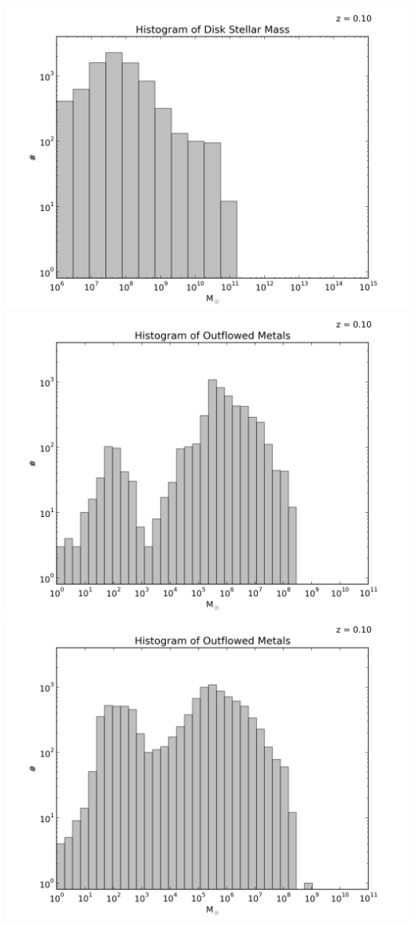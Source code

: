 \begin{itemize}
\includegraphics[scale=0.5]{analysis/galacticus/histograms/Histogram_of_Disk_Stellar_Massgalacticus_nestages_SLtest2_0000.png} \\
\includegraphics[scale=0.5]{analysis/galacticus/histograms/Histogram_of_Outflowed_Metalsgalacticus_nestages12_0000.png} \\
\includegraphics[scale=0.5]{analysis/galacticus/histograms/Histogram_of_Outflowed_Metalsgalacticus_nestages12SLtest_0000.png} \\

\end{itemize}
